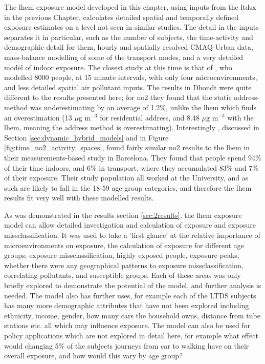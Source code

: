 The \gls{lhem} exposure model developed in this chapter, using inputs from the \gls{ltdsx} in the previous Chapter, calculates detailed spatial and temporally defined exposure estimates on a level not seen in similar studies. The detail in the inputs separates it in particular, such as the number of subjects, the time-activity and demographic detail for them, hourly and spatially resolved CMAQ-Urban data, mass-balance modelling of some of the transport modes, and a very detailed model of indoor exposure. The closest study at this time is that of \cite{Dhondt2012}, who modelled 8000 people, at 15 minute intervals, with only four microenvironments, and less detailed spatial air pollutant inputs. The results in Dhondt were quite different to the results presented here; for \gls{no2} they found that the static address-method was underestimating by an average of 1.2\%, unlike the \gls{lhem} which finds an overestimation (13 $\mu \text{g m}^{-3}$ for residential address, and 8.48 $\mu \text{g m}^{-3}$ with the \gls{lhem}, meaning the address method is overestimating). Interestingly \cite{DeNazelle2013}, discussed in Section \ref{sec:dynamic_hybrid_models} and in Figure \ref{fig:time_no2_activity_spaces}, found fairly similar \gls{no2} results to the \gls{lhem} in their measurements-based study in Barcelona. They found that people spend 94\% of their time indoors, and 6\% in transport, where they accumulated 83\% and 7\% of their exposure. Their study population all worked at the University, and as such are likely to fall in the 18-59 age-group categories, and therefore the \gls{lhem} results fit very well with these modelled results.

As was demonstrated in the results section \ref{sec:2results}, the \gls{lhem} exposure model can allow detailed investigation and calculation of exposure and exposure missclassification. It was used to take a 'first glance' at the relative importance of microenvironments on exposure, the calculation of exposure for different age groups, exposure missclassification, highly exposed people, exposure peaks, whether there were any geographical patterns to exposure missclassification, correlating pollutants, and susceptible groups. Each of these areas was only briefly explored to demonstrate the potential of the model, and further analysis is needed. The model also has further uses, for example each of the LTDS subjects has many more demographic attributes that have not been explored including ethnicity, income, gender, how many cars the household owns, distance from tube stations etc. all which may influence exposure. The model can also be used for policy applications which are not explored in detail here, for example what effect would changing 5\% of the subjects journeys from car to walking have on their overall exposure, and how would this vary by age group?

